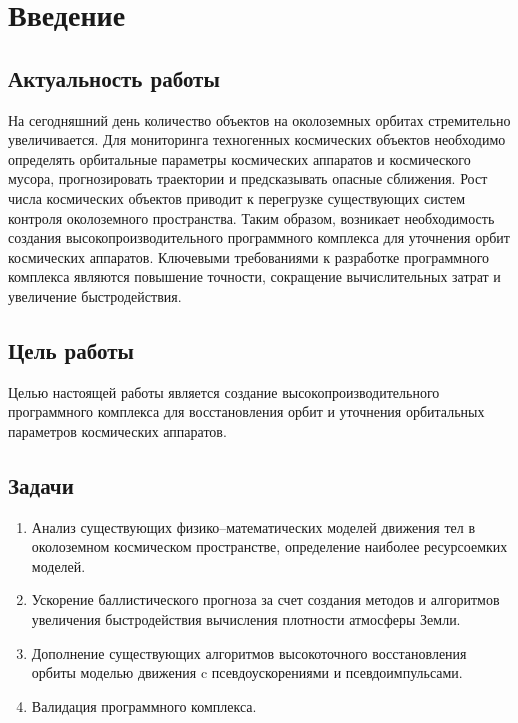 \section{Введение}
\label{sec:Chapter0} 

\subsection*{Актуальность работы}

На сегодняшний день количество объектов на околоземных орбитах стремительно увеличивается.
Для мониторинга техногенных космических объектов необходимо
определять орбитальные параметры космических аппаратов и космического мусора,
прогнозировать траектории и предсказывать опасные сближения.
Рост числа космических объектов приводит к перегрузке существующих систем 
контроля околоземного пространства.
Таким образом, возникает необходимость создания высокопроизводительного программного 
комплекса для уточнения орбит космических аппаратов. 
Ключевыми требованиями к разработке программного 
комплекса являются повышение точности, 
сокращение вычислительных затрат и увеличение быстродействия.

\subsection*{Цель работы}

Целью настоящей работы является создание высокопроизводительного 
программного комплекса для восстановления орбит и уточнения орбитальных параметров 
космических аппаратов.

\subsection*{Задачи}

\begin{enumerate}
    \item Анализ существующих физико--математических моделей движения тел 
    в околоземном космическом пространстве, определение наиболее ресурсоемких моделей.
    \item Ускорение баллистического прогноза за счет создания методов и алгоритмов 
    увеличения быстродействия вычисления плотности атмосферы Земли.
    \item Дополнение существующих алгоритмов высокоточного восстановления орбиты моделью 
    движения c псевдоускорениями и псевдоимпульсами.
    \item Валидация программного комплекса.
\end{enumerate}

